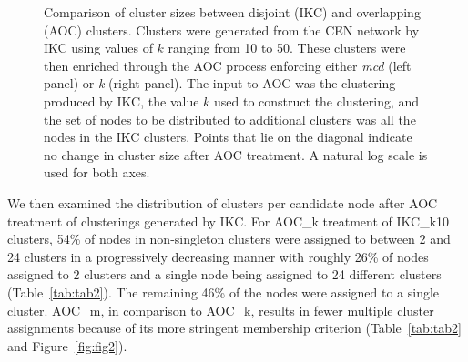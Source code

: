 \documentclass[12pt, oneside]{article}   	%
\begin{document}
\begin{figure}[H]
\begin{subfigure}[t]{0.48\textwidth}
		\end{subfigure}
		\captionsetup{width=0.9\textwidth}	
		\caption{Comparison of cluster sizes between disjoint (IKC)  and overlapping (AOC) clusters. Clusters were generated from the CEN network by IKC using values of $k$ ranging from 10 to 50. These clusters were then enriched through the AOC process enforcing either \emph{mcd} (left panel) or \emph{k} (right panel). The input to AOC was the  clustering produced by 
			IKC, the value $k$ used to construct the clustering, and the set of nodes to be distributed to additional clusters was all the nodes in the IKC clusters.  Points that lie on the diagonal indicate no change in cluster size after AOC treatment. A natural log scale is used for both axes.}
		\label{fig:fig1}
	\end{figure}
	
	We then examined the distribution of clusters per candidate node after AOC treatment of clusterings generated by  IKC. For AOC\_k treatment of IKC\_k10 clusters, 54\% of nodes in non-singleton clusters were assigned to between 2 and 24 clusters in a progressively decreasing manner with roughly 26\% of nodes assigned to 2 clusters and a single node being assigned to 24 different clusters (Table~\ref{tab:tab2}). 
	The remaining 46\% of the nodes were assigned to a single cluster. 
	AOC\_m, in comparison to AOC\_k, results in fewer multiple cluster assignments because of its more stringent membership criterion (Table~\ref{tab:tab2} and Figure~\ref{fig:fig2}).
	
\end{document}
